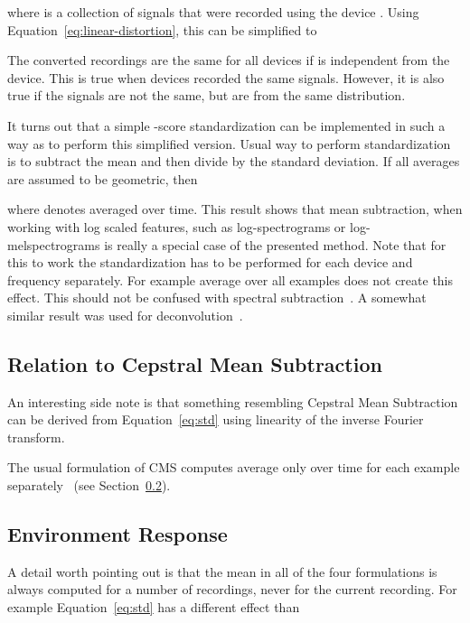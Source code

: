 \documentclass[a4paper]{article}
\begin{document}
where  is a collection of signals that were recorded using the device . Using Equation~\eqref{eq:linear-distortion}, this can be simplified to

The converted recordings are the same for all devices if  is independent from the device. This is true when devices recorded the same signals. However, it is also true if the signals are not the same, but are from the same distribution.



It turns out that a simple -score standardization can be implemented in such a way as to perform this simplified version. Usual way to perform standardization is to subtract the mean and then divide by the standard deviation. If all averages are assumed to be geometric, then

where  denotes  averaged over time.
This result shows that mean subtraction, when working with log scaled features, such as log-spectrograms or log-melspectrograms is really a special case of the presented method. Note that for this to work the standardization has to be performed for each device and frequency separately. For example average over all examples does not create this effect.
This should not be confused with spectral subtraction~\cite{bollSuppressionAcousticNoise1979}. A somewhat similar result was used for deconvolution~\cite{stockhamBlindDeconvolutionDigital1975}.

\subsection{Relation to Cepstral Mean Subtraction}

An interesting side note is that something resembling Cepstral Mean Subtraction can be derived from Equation~\eqref{eq:std} using linearity of the inverse Fourier transform.

\noindent The usual formulation of CMS computes average only over time for each example separately~\cite{mammoneRobustSpeakerRecognition1996} (see Section~\ref{ssec:env-resp}). 




\subsection{Environment Response}
\label{ssec:env-resp}

A detail worth pointing out is that the mean in all of the four formulations is always computed for a number of recordings, never for the current recording. For example Equation~\eqref{eq:std} has a different effect than
\end{document}
